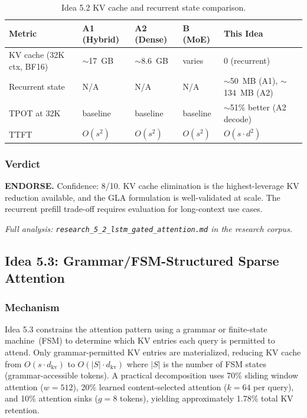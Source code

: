 \documentclass[11pt]{article}
\begin{document}
\begin{table}[h]
\centering
\caption{Idea 5.2 KV cache and recurrent state comparison.}
\small
\begin{tabular}{lllll}
\toprule
Metric & A1 (Hybrid) & A2 (Dense) & B (MoE) & This Idea \\
\midrule
KV cache (32K ctx, BF16) & $\sim$17~GB & $\sim$8.6~GB & varies & 0 (recurrent) \\
Recurrent state & N/A & N/A & N/A & $\sim$50~MB (A1), $\sim$134~MB (A2) \\
TPOT at 32K & baseline & baseline & baseline & $\sim$51\% better (A2 decode) \\
TTFT & $O(s^2)$ & $O(s^2)$ & $O(s^2)$ & $O(s \cdot d^2)$ \\
\bottomrule
\end{tabular}
\end{table}

\subsubsection*{Verdict}

\noindent\textbf{ENDORSE.} Confidence: 8/10. KV cache elimination is the highest-leverage KV reduction available, and the GLA formulation is well-validated at scale. The recurrent prefill trade-off requires evaluation for long-context use cases.

\par\noindent\textit{Full analysis: \texttt{research\_5\_2\_lstm\_gated\_attention.md} in the research corpus.}


\subsection{Idea 5.3: Grammar/FSM-Structured Sparse Attention}
\label{subsec:idea53}

\subsubsection*{Mechanism}

Idea 5.3 constrains the attention pattern using a grammar or finite-state machine~(FSM) to determine which KV entries each query is permitted to attend. Only grammar-permitted KV entries are materialized, reducing KV cache from $O(s \cdot d_{\text{kv}})$ to $O(|S| \cdot d_{\text{kv}})$ where $|S|$ is the number of FSM states (grammar-accessible tokens). A practical decomposition uses 70\% sliding window attention ($w{=}512$), 20\% learned content-selected attention ($k{=}64$ per query), and 10\% attention sinks ($g{=}8$ tokens), yielding approximately 1.78\% total KV retention.
\end{document}

